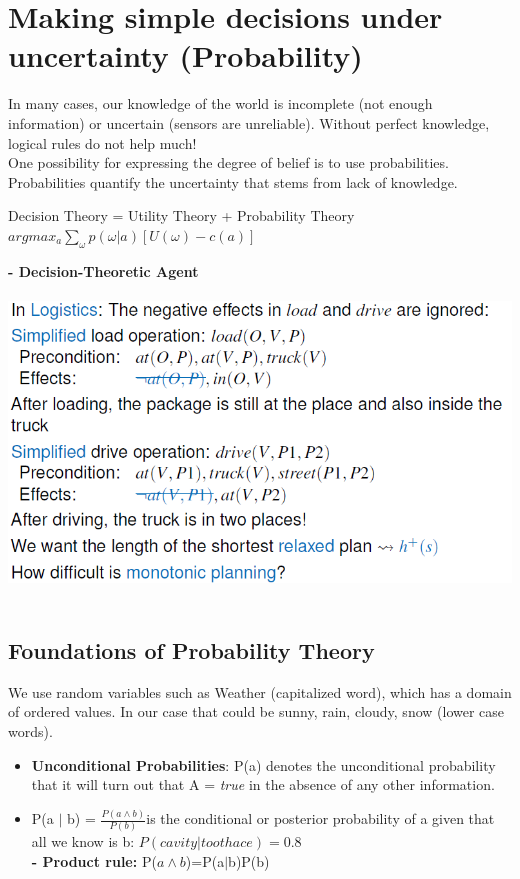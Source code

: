 \documentclass{article}
\begin{document}
\section{Making simple decisions under uncertainty (Probability)}
In many cases, our knowledge of the world is incomplete (not enough information) or uncertain (sensors are unreliable). Without perfect knowledge, logical rules do not help much!\\
One possibility for expressing the degree of belief is to use probabilities. Probabilities quantify the uncertainty that stems from lack of knowledge.\\
\begin{center}
Decision Theory = Utility Theory + Probability Theory\\
$argmax_a \sum_{\omega} p(\omega|a)[U(\omega)-c(a)]$
\end{center}
\textbf{- Decision-Theoretic Agent}\\\\
\includegraphics[scale=0.6]{58.png}\\\\

\subsection{Foundations of Probability Theory}
We use random variables such as Weather (capitalized word), which has a domain of ordered values. In our case that could be sunny, rain, cloudy, snow (lower case words).\\
\begin{itemize}
\item \textbf{Unconditional Probabilities}: P(a) denotes the unconditional probability that it will turn out that A = \textit{true} in the absence of any other information.
\item P(a $|$ b) = $\frac{P(a \wedge b)}{P(b)} $is the conditional or posterior probability of a given that all we know is b: $P(cavity|toothace) = 0.8$\\
\textbf{- Product rule:} P($a \wedge b$)=P(a$|$b)P(b)\\
\end{itemize}
\end{document}
